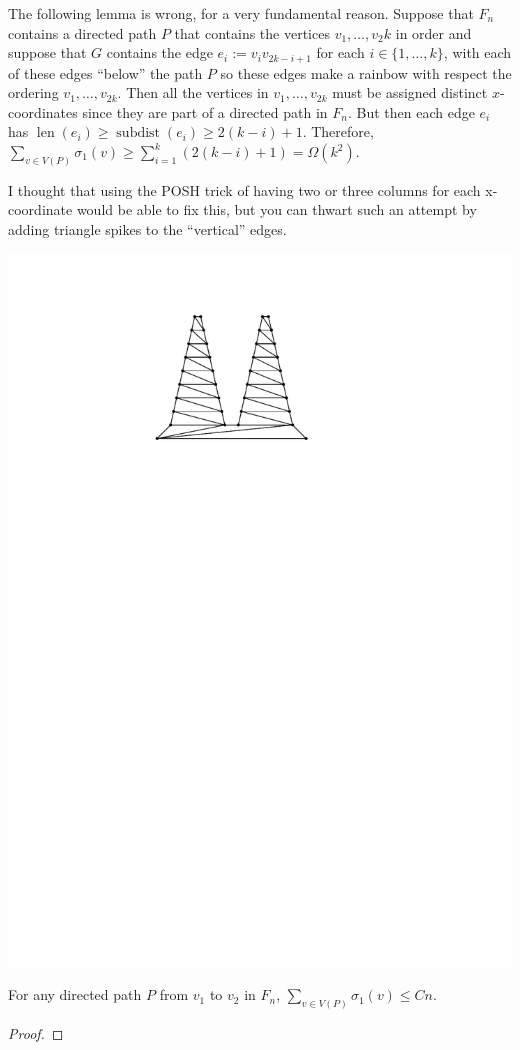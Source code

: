 \documentclass{patmorin}
\newenvironment{epat}{\color{Maroon}}{}
\DeclareMathOperator{\sd}{subdist}
\DeclareMathOperator{\len}{len}
\begin{document}
\begin{epat}
  The following lemma is wrong, for a very fundamental reason.  Suppose that $F_n$ contains a directed path $P$ that contains the vertices $v_1,\ldots,v_2k$ in order and suppose that $G$ contains the edge $e_i:=v_iv_{2k-i+1}$ for each $i\in\{1,\ldots,k\}$, with each of these edges ``below'' the path $P$ so these edges make a rainbow with respect the ordering $v_1,\ldots,v_{2k}$.  Then all the vertices in $v_1,\ldots,v_{2k}$ must be assigned distinct $x$-coordinates since they are part of a directed path in $F_n$. But then each edge $e_i$ has $\len(e_i)\ge \sd(e_i)\ge 2(k-i)+1$. Therefore, $\sum_{v\in V(P)}\sigma_1(v)\ge \sum_{i=1}^k (2(k-i)+1) = \Omega(k^2)$.

  I thought that using the POSH trick of having two or three columns for each x-coordinate would be able to fix this, but you can thwart such an attempt by adding triangle spikes to the ``vertical'' edges.

  \begin{center}
    \includegraphics[page=2]{figs/crap.pdf}
  \end{center}
\end{epat}

\begin{lem}
  For any directed path $P$ from $v_1$ to $v_2$ in $F_n$, $\sum_{v\in V(P)} \sigma_1(v) \le Cn$.
\end{lem}

\begin{proof}
\end{proof}
\end{document}
